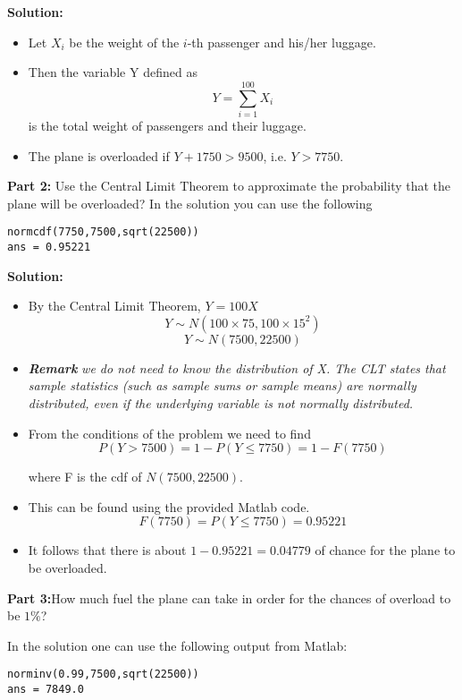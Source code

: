 \noindent\textbf{Solution:}
\begin{itemize}
	\item Let $X_i$ be the weight of the $i$-th passenger and his/her luggage.
	\item Then the variable Y defined as \[ Y = \sum^{100}_{i=1} X_i \] is the
	total weight of passengers and their luggage.
	\item The plane is overloaded if $Y + 1750 > 9500$, i.e. $Y > 7750$.
	
\end{itemize}


\noindent\textbf{Part 2:} Use the Central Limit Theorem to approximate the probability that the plane will be overloaded?
In the solution you can use the following
\begin{verbatim}
normcdf(7750,7500,sqrt(22500))
ans = 0.95221
\end{verbatim}

\noindent\textbf{Solution:}
\begin{itemize}
	\item By the Central Limit Theorem, $Y = 100X $
	\[ Y\sim N(100 \times 75, 100 \times 15^2)  \]
	\[ Y\sim  N(7500, 22500) \]
	\item \textbf{\emph{Remark}}\emph{ we do not need to know the distribution of X. The CLT states that sample statistics (such as sample sums or sample means) are normally distributed, even if the underlying variable is not normally distributed.}
	\item From the conditions of the problem we need to find
	\[P(Y > 7500) = 1 - P(Y \leq 7750) = 1 - F(7750)\]
	
	where F is the cdf of $N(7500, 22500)$.
	
	\item This can be found using the provided Matlab code.
	\[  F(7750) = P(Y \leq 7750) = 0.95221 \]
	\item It follows that there is about $1 - 0.95221 = 0.04779$ of chance for the plane to be overloaded.
\end{itemize}

\noindent\textbf{Part 3:}How much fuel the plane can take in order for the chances of overload to be $1\%$?

In the solution one can use the following output from Matlab:
\begin{verbatim}
norminv(0.99,7500,sqrt(22500))
ans = 7849.0
\end{verbatim}




